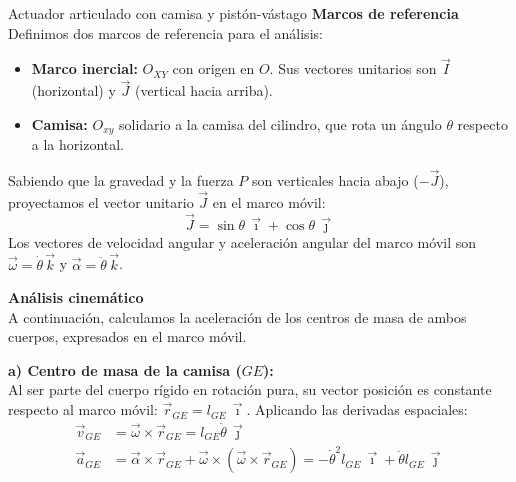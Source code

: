 \begin{solucion}{Actuador articulado con camisa y pistón-vástago}
\textbf{Marcos de referencia}\\

Definimos dos marcos de referencia para el análisis:
\begin{itemize}
    \item \textbf{Marco inercial:} $O_{XY}$ con origen en $O$. Sus vectores unitarios son $\vec{I}$ (horizontal) y $\vec{J}$ (vertical hacia arriba).
    \item \textbf{Camisa:} $O_{xy}$ solidario a la camisa del cilindro, que rota un ángulo $\theta$ respecto a la horizontal.
\end{itemize}

\begin{center}
\end{center}

Sabiendo que la gravedad y la fuerza $P$ son verticales hacia abajo ($-\vec{J}$), proyectamos el vector unitario $\vec{J}$ en el marco móvil:
\begin{equation}
    \vec{J} = \sin\theta\, \vec{\imath} + \cos\theta\, \vec{\jmath}
\end{equation}
Los vectores de velocidad angular y aceleración angular del marco móvil son $\vec{\omega} = \dot{\theta}\, \vec{k}$ y $\vec{\alpha} = \ddot{\theta}\, \vec{k}$.

\textbf{Análisis cinemático}\\

A continuación, calculamos la aceleración de los centros de masa de ambos cuerpos, expresados en el marco móvil.

\textbf{a) Centro de masa de la camisa ($GE$):}\\
Al ser parte del cuerpo rígido en rotación pura, su vector posición es constante respecto al marco móvil: $\vec{r}_{GE} = l_{GE}\, \vec{\imath}$. Aplicando las derivadas espaciales:
\begin{align}
    \vec{v}_{GE} &= \vec{\omega} \times \vec{r}_{GE} = l_{GE}\dot{\theta}\, \vec{\jmath} \\
    \vec{a}_{GE} &= \vec{\alpha} \times \vec{r}_{GE} + \vec{\omega} \times (\vec{\omega} \times \vec{r}_{GE}) = -\dot{\theta}^2 l_{GE}\, \vec{\imath} + \ddot{\theta} l_{GE}\, \vec{\jmath}
\end{align}


\end{solucion}
